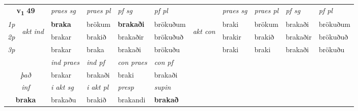 \noindent
\begin{tabular}{lllllllllll} \toprule
\multicolumn{2}{c}{\textbf{v{\textsubscript{1}}} \Large{\textbf{49}}}  &  \textit{praes sg}  & \textit{praes pl}  &\textit{ pf sg} & \textit{pf pl} &  &  \textit{praes sg}  & \textit{praes pl}  & \textit{pf sg} & \textit{pf pl } \\*
	\cmidrule{3-6} \cmidrule{8-11}
 {\textit{1p}} & \multirow{3}{*}{\begin{turn}{90}\textit{akt ind}\end{turn}} & \textbf{braka} & brökum & \textbf{brakaði} & brökuðum & \multirow{3}{*}{\begin{turn}{90}\textit{akt con}\end{turn}} &braki & brökum & brakaði & brökuðum\\*
 {\textit{2p}} &  &  brakar  & brakið & brakaðir & brökuðuð & & brakir & brakið & brakaðir & brökuðuð \\*
{\textit{3p}} &  & brakar & braka & brakaði & brökuðu & & braki & braki& brakaði & brökuðu \\*
\cmidrule{3-6} \cmidrule{8-11}

   & &  \textit{ind praes} & \textit{ind pf} & \textit{con praes} & \textit{con pf} \\*
\multicolumn{2}{c}{ \textit{það} } & brakar & brakaði & braki & brakaði \\*

\cmidrule{3-6}
   \multicolumn{2}{c}{\textit{inf}}  & \textit{i akt sg} & \textit{i akt pl}   & \textit{presp} & \textit{supin}   \\*
  \multicolumn{2}{c}{\textbf{braka}} & brakaðu  & brakið   & brakandi &  \textbf{brakað}   \\*
\end{tabular}

